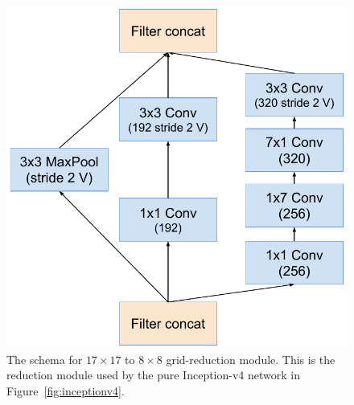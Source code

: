 \begin{figure}
\centering
\includegraphics[width=\linewidth]{reductionto8}
\caption{The schema for $17\times 17$ to $8\times 8$ grid-reduction module.
  This is the reduction module used by the pure Inception-v4 network in
  Figure~\ref{fig:inceptionv4}.
}
\label{fig:reductionto8}
\end{figure}
